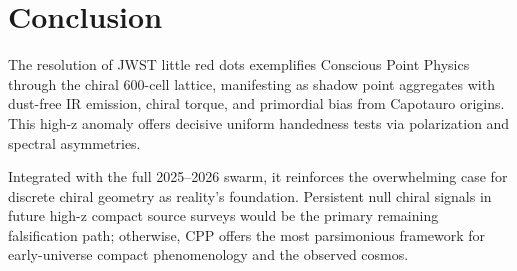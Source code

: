\documentclass[11pt]{article}
\begin{document}
\section{Conclusion}
The resolution of JWST little red dots exemplifies Conscious Point Physics through the chiral 600-cell lattice, manifesting as shadow point aggregates with dust-free IR emission, chiral torque, and primordial bias from Capotauro origins. This high-z anomaly offers decisive uniform handedness tests via polarization and spectral asymmetries.  

Integrated with the full 2025--2026 swarm, it reinforces the overwhelming case for discrete chiral geometry as reality's foundation. Persistent null chiral signals in future high-z compact source surveys would be the primary remaining falsification path; otherwise, CPP offers the most parsimonious framework for early-universe compact phenomenology and the observed cosmos.
\end{document}
